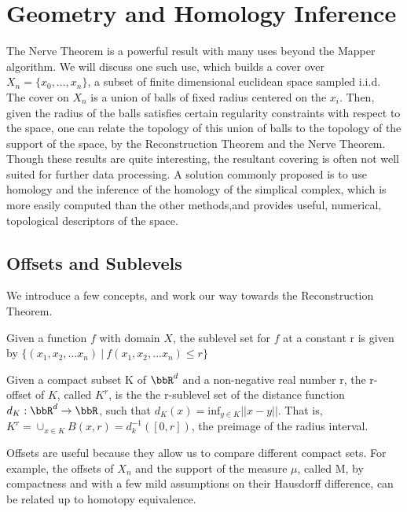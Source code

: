 \section{Geometry and Homology Inference}
The Nerve Theorem is a powerful result with many uses beyond the Mapper algorithm. We will discuss one such use, which builds a cover over $X_n = \{x_0, ..., x_n\}$, a subset of finite dimensional euclidean space sampled i.i.d. The cover on $X_n$ is a union of balls of fixed radius centered on the $x_i$. Then, given the radius of the balls satisfies certain regularity constraints with respect to the space, one can relate the topology of this union of balls to the topology of the support of the space, by the Reconstruction Theorem and the Nerve Theorem. Though these results are quite interesting, the resultant covering is often not well suited for further data processing. A solution commonly proposed is to use homology and the inference of the homology of the simplical complex, which is more easily computed than the other methods,and provides useful, numerical, topological descriptors of the space.

\subsection{Offsets and Sublevels} 

We introduce a few concepts, and work our way towards the Reconstruction Theorem.

\begin{definition}
Given a function $f$ with domain $X$, the sublevel set for $f$ at a constant r is given by $\{(x_1, x_2, ... x_n) \: | \: f(x_1, x_2, ... x_n) \leq r\}$
\end{definition}

\begin{definition}[r-offset]
Given a compact subset K of $\bbR^d$ and a non-negative real number r, the r-offset of $K$, called $K^r$, is the the r-sublevel set of the distance function $d_K:\bbR^d \rightarrow \bbR$, such that $d_K(x) = \text{inf}_{y\in K}||x-y||$. That is, $K^r = \cup_{x\in{K}}B(x, r) = d_{k}^{-1}([0, r])$, the preimage of the radius interval.
\end{definition}

Offsets are useful because they allow us to compare different compact sets. For example, the offsets of $X_n$ and the support of the measure $\mu$, called M, by compactness and with a few mild assumptions on their Hausdorff difference, can be related up to homotopy equivalence.

